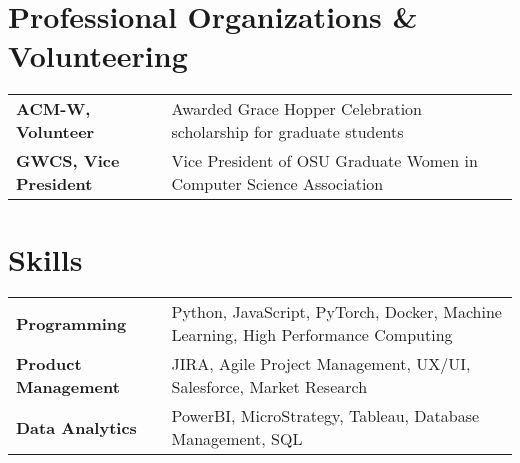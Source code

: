 \documentclass[a4paper,10pt]{article}
\begin{document}
\section{Professional Organizations \& Volunteering}
\begin{tabularx}{\linewidth}{@{}l X@{}}
\textbf{ACM-W, Volunteer} & \normalsize{Awarded Grace Hopper Celebration scholarship for graduate students} \\
\textbf{GWCS, Vice President}  & \normalsize{Vice President of OSU Graduate Women in Computer Science Association}\\ 

\end{tabularx}

\section{Skills}
\begin{tabularx}{\linewidth}{@{}l X@{}}
\textbf{Programming} &  \normalsize{Python, JavaScript, PyTorch, Docker, Machine Learning, High Performance Computing}\\
\textbf{Product Management}  &  \normalsize{JIRA, Agile Project Management, UX/UI, Salesforce, Market Research}\\  
\textbf{Data Analytics}  &  \normalsize{PowerBI, MicroStrategy, Tableau, Database Management, SQL}\\ 
\end{tabularx}

\vfill
{}
\end{document}
